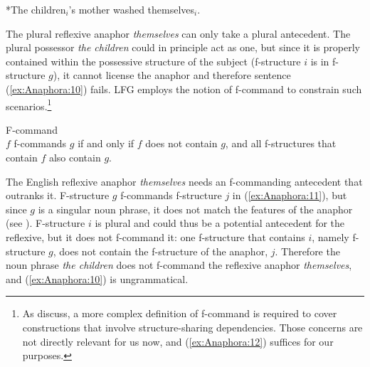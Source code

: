 \documentclass[output=paper,hidelinks]{langscibook}
\begin{document}
\ea\label{ex:Anaphora:10} *The children$_i$'s mother washed themselves$_i$.
\z


\noindent The plural reflexive anaphor \emph{themselves} can only take a plural antecedent. The plural possessor \emph{the children} could in principle act as one, but since it is properly contained within the possessive structure of the subject (f-structure $i$ is in f-structure $g$), it cannot license the anaphor and therefore sentence (\ref{ex:Anaphora:10}) fails. LFG employs the notion of f-command to constrain such scenarios.\footnote{As \citet[239]{DLM:LFG} discuss, a more complex definition of f-command is required to cover constructions that involve structure-sharing dependencies. Those concerns are not directly relevant for us now, and (\ref{ex:Anaphora:12}) suffices for our purposes.}

\ea\label{ex:Anaphora:12} F-command \citep[238]{DLM:LFG}\\[1ex]
$f$ f-commands $g$ if and only if $f$ does not contain $g$, and all f-structures that contain $f$ also contain $g$.
\z

\noindent The English reflexive anaphor \emph{themselves} needs an f-commanding antecedent that outranks it. F-structure $g$ f-commands f-structure $j$ in (\ref{ex:Anaphora:11}), but since $g$ is a singular noun phrase, it does not match the {\NINDEX} features of the anaphor (see ). F-structure $i$ is plural and could thus be a potential antecedent for the reflexive, but it does not f-command it: one f-structure that contains $i$, namely f-structure $g$, does not contain the f-structure of the anaphor, $j$. Therefore the noun phrase \emph{the children} does not f-command the reflexive anaphor \emph{themselves}, and (\ref{ex:Anaphora:10}) is ungrammatical.
\end{document}
